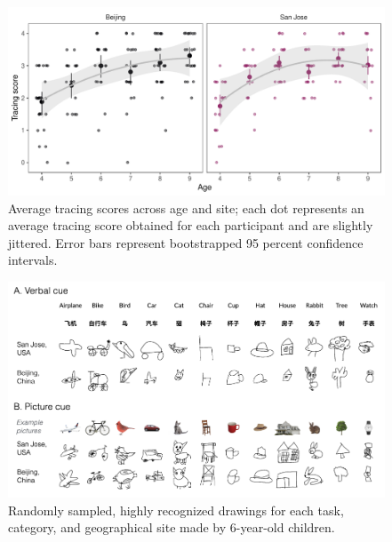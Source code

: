 \documentclass[
  man]{apa6}
\begin{document}
\begin{figure}[H]

{\centering \includegraphics[width=\textwidth]{figs/tracing-1} 

}

\caption{Average tracing scores across age and site; each dot represents an average tracing score obtained for each participant and are slightly jittered. Error bars represent bootstrapped 95 percent confidence intervals.}\label{fig:tracing}
\end{figure}

\begin{figure}[H]
\includegraphics[width=1\linewidth]{figs/example_drawings} \caption{Randomly sampled, highly recognized drawings for each task, category, and geographical site made by 6-year-old children.}\label{fig:example-drawings}
\end{figure}
\end{document}
